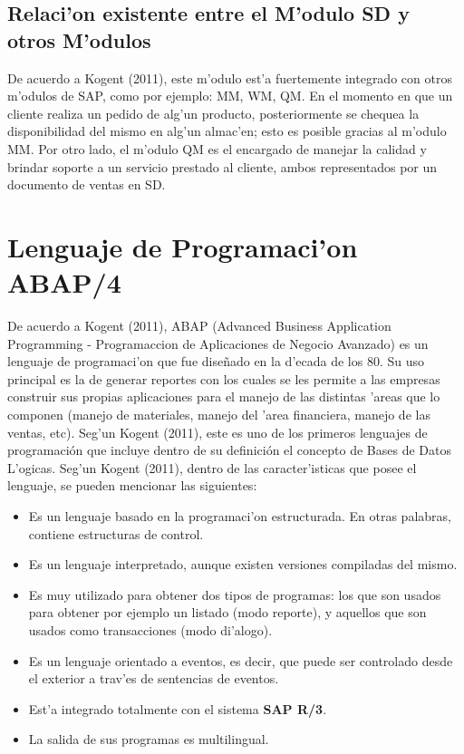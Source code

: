 \subsection{Relaci'on existente entre el M'odulo SD y otros M'odulos}
De acuerdo a Kogent (2011), este m'odulo est'a fuertemente integrado con otros m'odulos de SAP, como por ejemplo: MM, WM, QM. 
\newline
\newline
\indent En el momento en que un cliente realiza un pedido de alg'un producto, posteriormente se chequea la disponibilidad del mismo en alg'un almac'en; esto es posible gracias al m'odulo MM. 
\newline
\newline
\indent Por otro lado, el m'odulo QM es el encargado de manejar la calidad y brindar soporte a un servicio prestado al cliente, ambos representados por un documento de ventas en SD. 

\section{Lenguaje de Programaci'on ABAP/4} \label{sect:abap}
De acuerdo a Kogent (2011), ABAP (Advanced Business Application Programming - Programaccion de Aplicaciones de Negocio Avanzado) es un lenguaje de programaci'on que fue dise\~nado en la d'ecada de los 80. Su uso principal es la de generar reportes con los cuales se les permite a las empresas construir sus propias aplicaciones para el manejo de las distintas 'areas que lo componen (manejo de materiales, manejo del 'area financiera, manejo de las ventas, etc).
\newline
\newline
Seg'un Kogent (2011), este es uno de los primeros lenguajes de programación que incluye dentro de su definición el concepto de Bases de Datos L'ogicas. 
\newline
\newline
Seg'un Kogent (2011), dentro de las caracter'isticas que posee el lenguaje, se pueden mencionar las siguientes:
\begin{itemize}
\item Es un lenguaje basado en la programaci'on estructurada. En otras palabras, contiene estructuras de control.
\item Es un lenguaje interpretado, aunque existen versiones compiladas del mismo.
\item Es muy utilizado para obtener dos tipos de programas: los que son usados para obtener por ejemplo un listado (modo reporte), y aquellos que son usados como transacciones (modo di'alogo).
\item Es un lenguaje orientado a eventos, es decir, que puede ser controlado desde el exterior a trav'es de sentencias de eventos.
\item Est'a integrado totalmente con el sistema \textbf{SAP R/3}.
\item La salida de sus programas es multilingual. 
\end{itemize}

